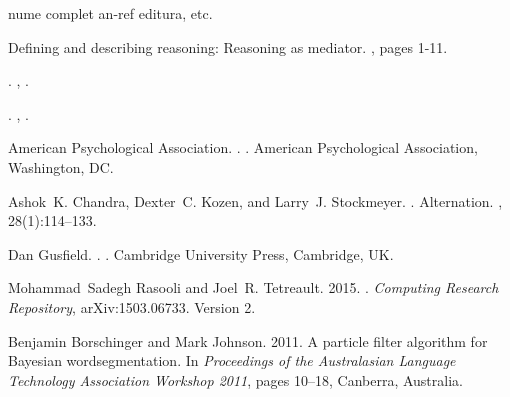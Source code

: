 \documentclass[11pt]{article}
\begin{document}
\begin{thebibliography}{}

nume complet
\newblock an-ref
\newblock editura, etc.

{Defining and describing reasoning: Reasoning as mediator}.
, pages 1-11.


\bibitem[\protect\citename{{}}]{}
{}.
\newblock 
\newblock {\em }, .


\bibitem[\protect\citename{{}}]{}
{}.
\newblock 
\newblock {\em }, .


{American Psychological Association}.
.
.
\newblock American Psychological Association, Washington, DC.

Ashok~K. Chandra, Dexter~C. Kozen, and Larry~J. Stockmeyer.
.
\newblock Alternation.
,
 28(1):114--133.

Dan Gusfield.
.
.
\newblock Cambridge University Press, Cambridge, UK.

Mohammad~Sadegh Rasooli and Joel~R. Tetreault. 2015.
.
\newblock \emph{Computing Research Repository}, arXiv:1503.06733.
\newblock Version 2.

Benjamin Borschinger and Mark Johnson. 2011.
\newblock A particle filter algorithm for {B}ayesian wordsegmentation.
\newblock In \emph{Proceedings of the Australasian Language Technology Association Workshop 2011}, pages 10--18, Canberra, Australia.

\end{thebibliography}
\end{document}
